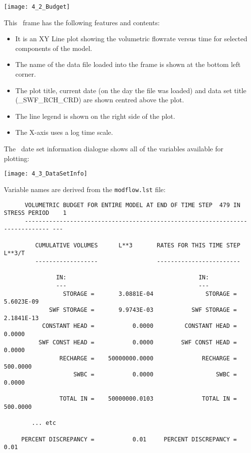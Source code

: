         \texttt{[image: 4\_2\_Budget]}

This \tecplot\ frame has the following features and contents:
\begin{itemize}
  \item It is an {\sf XY Line} plot showing the volumetric flowrate versus time for selected components of the model.
  \item The name of the data file loaded into the frame is shown at the bottom left corner.
  \item The plot title, current date (on the day the file was loaded) and data set title ({\_SWF\_RCH\_CRD}) are shown centred above the plot.
  \item The line legend is shown on the right side of the plot.
  \item The X-axis uses a log time scale.
\end{itemize}

The \tecplot\ date set information dialogue shows all of the variables available for plotting:

        \texttt{[image: 4\_3\_DataSetInfo]}

Variable names are derived from the {\tt modflow.lst} file:
\begin{verbatim}
      VOLUMETRIC BUDGET FOR ENTIRE MODEL AT END OF TIME STEP  479 IN STRESS PERIOD    1
      ----------------------------------------------------------------------------- ---

         CUMULATIVE VOLUMES      L**3       RATES FOR THIS TIME STEP      L**3/T
         ------------------                 ------------------------

               IN:                                      IN:
               ---                                      ---
                 STORAGE =       3.0881E-04               STORAGE =       5.6023E-09
             SWF STORAGE =       9.9743E-03           SWF STORAGE =       2.1841E-13
           CONSTANT HEAD =           0.0000         CONSTANT HEAD =           0.0000
          SWF CONST HEAD =           0.0000        SWF CONST HEAD =           0.0000
                RECHARGE =    50000000.0000              RECHARGE =         500.0000
                    SWBC =           0.0000                  SWBC =           0.0000

                TOTAL IN =    50000000.0103              TOTAL IN =         500.0000

        ... etc

     PERCENT DISCREPANCY =           0.01     PERCENT DISCREPANCY =           0.01
\end{verbatim}


